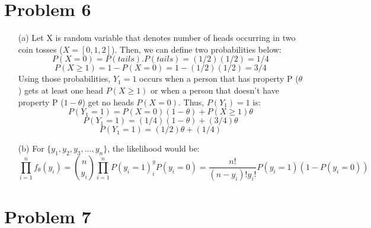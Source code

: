 \documentclass[twoside]{homework}
\begin{document}
\section*{Problem 6}
\begin{itemize}
    \item [(a)] Let X is random variable that denotes number of heads occurring in two coin tosses ($X=[0,1,2]$). Then, we can define two probabilities below:
    $$P(X=0)=P(tails).P(tails)=(1/2)(1/2)=1/4$$
    $$P(X\geq1)=1-P(X=0)=1-(1/2)(1/2)=3/4$$
    Using those probabilities, $Y_1=1$ occurs when a person that has property P ($\theta$) gets at least one head $P(X\geq1)$ or when a person that doesn't have property P ($1-\theta$) get no heads $P(X=0)$. Thus, $P(Y_1)=1$ is:
    $$P(Y_1=1)=P(X=0)(1-\theta) + P(X\geq1)\theta$$
    $$P(Y_1=1)=(1/4)(1-\theta) + (3/4)\theta$$
    $$P(Y_1=1)=(1/2)\theta + (1/4)$$
    \item [(b)] For $\{y_1, y_2, y_3, ..., y_n\}$, the likelihood would be: 
    $$\prod_{i=1}^{n}f_{\theta}(y_i)=\binom{n}{y_i}\prod_{i=1}^{n}P(y_i=1)^y_iP(y_i=0)=\frac{n!}{(n-y_i)!y_i!}P(y_i=1)(1-P(y_i=0))$$
    
\end{itemize}

\section*{Problem 7}
\end{document}
